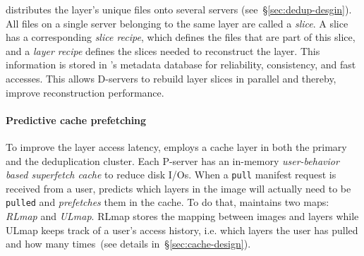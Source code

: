 \sysname distributes the layer's unique files
onto several servers (see~\S\ref{sec:dedup-desgin}).
%
All files on a single server belonging to the same layer are called a \emph{slice}. A slice
has a corresponding \emph{slice recipe}, which defines the files that are part of this slice,
and a \emph{layer recipe} defines the slices needed to reconstruct the layer. This information
is stored in \sysname{}'s metadata database
for reliability, consistency, and fast accesses. 
%
This allows D-servers to rebuild layer slices in parallel and thereby, improve reconstruction
performance.
%


\paragraph{Predictive cache prefetching}

To improve the layer access latency, \sysname employs a cache layer in both the
primary and the deduplication cluster.
%
Each P-server has an in-memory \emph{user-behavior based superfetch cache}
to reduce disk I/Os.
%
When a \texttt{pull} manifest request is received from a user,
\sysname predicts which layers in the image will actually need to be \texttt{pulled}
and \emph{prefetches} them in the cache.
To do that, \sysname maintains two maps: \emph{RLmap} and \emph{ULmap}. RLmap
stores the mapping between images and layers while ULmap keeps track of
a user's access history, i.e. which layers the user has pulled and how many
times~(see details in~\S\ref{sec:cache-design}).
%

